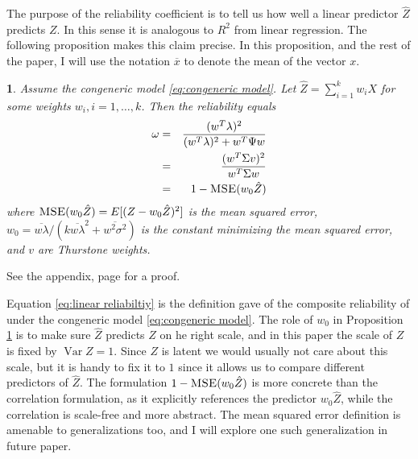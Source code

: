 \documentclass{article}
\makeatletter
\theoremstyle{plain}
\theoremstyle{plain}
\theoremstyle{definition}
\theoremstyle{remark}
\theoremstyle{definition}
\theoremstyle{plain}
\theoremstyle{plain}
\newtheorem{prop}[thm]{\protect\propositionname}
\theoremstyle{definition}
\newenvironment{proof}[1][\protect\proofname]{\par
	\normalfont\topsep6\p@\@plus6\p@\relax
	\trivlist
	\itemindent\parindent
	\item[\hskip\labelsep\scshape #1]\ignorespaces
}{%
	\endtrivlist\@endpefalse
}
\providecommand{\proofname}{Proof}
\providecommand{\propositionname}{Proposition}
\DeclareMathOperator{\Var}{Var}
\DeclareMathOperator{\MSE}{\textsc{MSE}}
\makeatother
\begin{document}
The purpose of the reliability coefficient is to tell us how well a linear predictor $\hat{Z}$ predicts $Z$. In this sense it is analogous to $R^2$ from linear regression. The following proposition makes this claim precise. In this proposition, and the rest of the paper, I will use the notation $\overline{x}$ to denote the mean of the vector $x$.

\begin{prop}
\label{prop:reliability motivation}Assume the congeneric model \eqref{eq:congeneric model}. Let $\hat{Z}=\sum_{i=1}^{k}w_{i}X$
for some weights $w_{i},i=1,\ldots,k$. Then the reliability equals
\begin{eqnarray}
\omega & = & \frac{(w^{T}\lambda)^{2}}{(w^{T}\lambda)^{2}+w^{T}\Psi w}\label{eq:linear reliabiltiy}\\
 & = & \frac{(w^{T}\Sigma v)^{2}}{w^{T}\Sigma w} \nonumber \\
 & = & 1- \MSE (w_{0}\hat{Z})\nonumber 
\end{eqnarray}
where $\MSE (w_{0}\hat{Z})=E[(Z-w_{0}\hat{Z})^{2}]$ is the
mean squared error, $w_{0}=\overline{w\lambda}/(k\overline{w\lambda}^{2}+\overline{w^{2}\sigma^{2}})$ is the constant minimizing the mean squared error, and $v$ are Thurstone weights.
\end{prop}
\begin{proof}
See the appendix, page \pageref{proof:reliability motivation} for a proof.
\end{proof}

Equation \eqref{eq:linear reliabiltiy} is the definition \citet[][p. 112]{Joreskog1971-nn} gave of the composite reliability of under the congeneric model \eqref{eq:congeneric model}. The role of $w_0$ in Proposition \ref{prop:reliability motivation} is to make sure $\hat{Z}$ predicts $Z$ on he right scale, and in this paper the scale of $Z$ is fixed by $\Var Z = 1$. Since $Z$ is latent we would usually not care about this scale, but it is handy to fix it to $1$ since it allows us to compare different predictors of $\hat{Z}$. The formulation $1-\MSE (w_{0}\hat{Z})$ is more concrete than the correlation formulation, as it explicitly references the predictor $w_{0}\hat{Z}$, while the correlation is scale-free and more abstract. The mean squared error definition is amenable to generalizations too, and I will explore one such generalization in future paper. 
\end{document}

